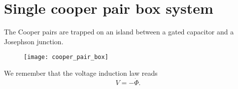 \section{Single cooper pair box system\label{sec:cooper_pair_box}}
The Cooper pairs are trapped on an island between a gated capacitor and a Josephson junction.
\begin{figure}[h]
  \centering \texttt{[image: cooper\_pair\_box]}
\end{figure}

\noindent

\begin{framed}\noindent
  We remember that the voltage induction law reads
  \begin{equation}\label{key}
    V = -\dot{\Phi}.
  \end{equation}
\end{framed}


